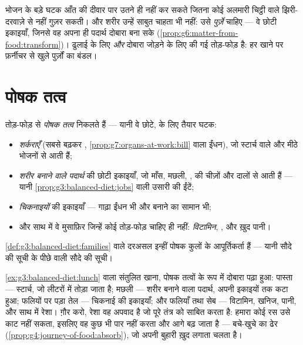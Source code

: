\begin{remark}[तोड़-फोड़ करनी ही क्यों है?]\label{rem:g7:digestion-and-nutrients:why}
भोजन के बड़े घटक आँत की दीवार पार उतने ही नहीं कर सकते जितना कोई अलमारी
चिट्ठी वाले झिरी-दरवाज़े से नहीं गुज़र सकती। और शरीर उन्हें साबुत चाहता
भी नहीं: उसे \emph{पुर्ज़े} चाहिए --- वे छोटी इकाइयाँ, जिनसे वह अपना
ही पदार्थ दोबारा बना सके
(\cref{prop:g6:matter-from-food:transform})।  ढुलाई के लिए
\emph{और} दोबारा जोड़ने के लिए की गई तोड़-फोड़ है: हर खाने पर फ़र्नीचर
से खुले पुर्ज़ों का बंडल।
\end{remark}

\section{पोषक तत्व}

\begin{definition}[पोषक तत्वों के कुल]\label{def:g7:digestion-and-nutrients:families}
तोड़-फोड़ से \emph{पोषक तत्व} निकलते हैं --- यानी वे
छोटे,  के लिए तैयार घटक:
\begin{itemize}
  \item \emph{शर्कराएँ} (सबसे बढ़कर ,
        \cref{prop:g7:organs-at-work:bill} वाला ईंधन), जो स्टार्च
        वाले और मीठे भोजनों से आती हैं;
  \item \emph{शरीर बनाने वाले पदार्थ} की छोटी इकाइयाँ, जो माँस,
        मछली, ,  की चीज़ों और दालों से आती हैं --- यानी
        \cref{prop:g3:balanced-diet:jobs} वाली उसारी की ईंटें;
  \item \emph{चिकनाइयों} की इकाइयाँ --- गाढ़ा ईंधन भी और बनाने का
        सामान भी;
  \item और साथ में वे मुसाफ़िर जिन्हें कोई तोड़-फोड़ चाहिए ही नहीं:
        \emph{विटामिन}, \emph{}, और ख़ुद पानी।
\end{itemize}
\cref{def:g3:balanced-diet:families} वाले  दरअसल इन्हीं पोषक
कुलों के आपूर्तिकर्ता हैं --- यानी सौदे की सूची के पीछे वाली सौदे की
सूची।
\end{definition}

\begin{example}[एक दोपहर का खाना, मद-दर-मद]\label{ex:g7:digestion-and-nutrients:lunch}
\cref{ex:g3:balanced-diet:lunch} वाला संतुलित खाना, पोषक तत्वों के रूप
में दोबारा पढ़ा हुआ: पास्ता --- स्टार्च, जो लीटरों  में तोड़ा
जाता है; मछली --- शरीर बनाने वाला पदार्थ, अपनी इकाइयों तक कटा हुआ;
फलियों पर पड़ा तेल --- चिकनाई की इकाइयाँ; और फलियाँ तथा सेब --- विटामिन,
खनिज, पानी, और साथ में रेशा। ग़ौर करो, रेशा वह अपवाद है जो पूरे तंत्र को
साबित करता है: हमारा कोई रस उसे काट नहीं सकता, इसलिए वह कुछ भी पार नहीं
करता और आगे बढ़ जाता है --- बचे-खुचे का ढेर
(\cref{prop:g4:journey-of-food:absorb}), जो अपनी बुहारी ख़ुद लगाता चलता
है।
\end{example}

